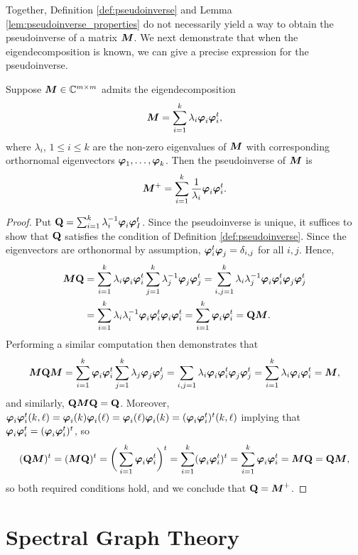 Together, Definition \ref{def:pseudoinverse} and Lemma \ref{lem:pseudoinverse_properties} do not necessarily yield a way to obtain the pseudoinverse of a matrix ${\vb*{M}}$. We  next demonstrate that when the eigendecomposition is known, we  can give a precise expression for the pseudoinverse. 

\begin{lemma}
Suppose ${\vb*{M}}\in\mathbb{C}^{m\times m}$ admits the eigendecomposition 
\[{\vb*{M}}=\sum_{i=1}^k \lambda_i \vb*{\varphi}_i\vb*{\varphi}_i^t,\]
where $\lambda_i$, $1\leq i\leq k$ are the non-zero eigenvalues of ${\vb*{M}}$ with corresponding orthornomal eigenvectors $\vb*{\varphi}_1,\dots,\vb*{\varphi}_k$. Then the pseudoinverse of ${\vb*{M}}$ is 
\begin{equation}
    \label{eq:pseudoinverse}
    {\vb*{M}}^+=\sum_{i=1}^k \frac{1}{\lambda_i}\vb*{\varphi}_i\vb*{\varphi}_i^t.
\end{equation}
\end{lemma}
\begin{proof}
Put $\vb{Q}=\sum_{i=1}^k \lambda_i^{-1}\vb*{\varphi}_i\vb*{\varphi}_I^t$. Since the pseudoinverse is unique, it suffices to show that $\vb{Q}$ satisfies the condition of Definition \ref{def:pseudoinverse}.
Since the eigenvectors are orthonormal by assumption, $\vb*{\varphi}_i^t\vb*{\varphi}_j=\delta_{i,j}$ for all $i,j$. Hence,  
\begin{align*}
    {\vb*{M}}\vb{Q}&= \sum_{i=1}^k \lambda_i\vb*{\varphi}_i\vb*{\varphi}_i^t \sum_{j=1}^k \lambda_j^{-1}\vb*{\varphi}_j\vb*{\varphi}_j^t = \sum_{i,j=1}^k \lambda_i\lambda_j^{-1} \vb*{\varphi}_i\vb*{\varphi}_i^t \vb*{\varphi}_j\vb*{\varphi}_j^t \\
    &= \sum_{i=1}^k \lambda_i\lambda_i^{-1} \vb*{\varphi}_i\vb*{\varphi}_i^t\vb*{\varphi}_i\vb*{\varphi}_i^t 
    = \sum_{i=1}^k \vb*{\varphi}_i\vb*{\varphi}_i^t = \vb{Q}{\vb*{M}}.
\end{align*}
Performing a similar computation then demonstrates that 
\[{\vb*{M}}\vb{Q}{\vb*{M}} = \sum_{i=1}^k \vb*{\varphi}_i\vb*{\varphi}_i^t \sum_{j=1}^k \lambda_j\vb*{\varphi}_j\vb*{\varphi}_j^t=\sum_{i,j=1}\lambda_i \vb*{\varphi}_i\vb*{\varphi}_i^t\vb*{\varphi}_j\vb*{\varphi}_j^t=\sum_{i=1}^k \lambda_i \vb*{\varphi}_i\vb*{\varphi}_i^t ={\vb*{M}},\]
and similarly, $\vb{Q}{\vb*{M}}\vb{Q}=\vb{Q}$. Moreover, $\vb*{\varphi}_i\vb*{\varphi}_i^t (k,\ell)=\vb*{\varphi}_i(k)\vb*{\varphi}_i(\ell)=\vb*{\varphi}_i(\ell)\vb*{\varphi}_i(k)=(\vb*{\varphi}_i\vb*{\varphi}_i^t)^t (k,\ell)$ implying that $\vb*{\varphi}_i\vb*{\varphi}_i^t=(\vb*{\varphi}_i\vb*{\varphi}_i^t)^t$, so 
\[(\vb{Q}{\vb*{M}})^t=({\vb*{M}}\vb{Q})^t =\bigg(\sum_{i=1}^k \vb*{\varphi}_i\vb*{\varphi}_i^t \bigg)^t = \sum_{i=1}^k (\vb*{\varphi}_i\vb*{\varphi}_i^t)^t = \sum_{i=1}^k \vb*{\varphi}_i\vb*{\varphi}_i^t={\vb*{M}}\vb{Q}=\vb{Q}{\vb*{M}},\]
so both required conditions hold, and we conclude that $\vb{Q}={\vb*{M}}^+$. 
\end{proof}



\section{Spectral Graph Theory}
\label{sec:background_spectral}

